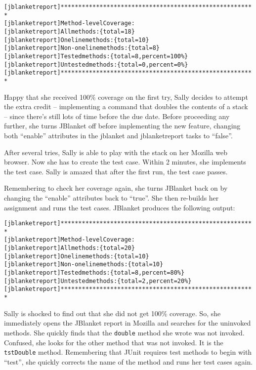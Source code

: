 \begin{alltt}
{\small{}[jblanketreport] *******************************************************
[jblanketreport] Method-level Coverage:
[jblanketreport] All methods: \{total=18\}
[jblanketreport] One line methods: \{total=10\}
[jblanketreport] Non-one line methods: \{total=8\}
[jblanketreport] Tested methods: \{total=8, percent=100\%\}
[jblanketreport] Untested methods: \{total=0,  percent=0\%\}
[jblanketreport] *******************************************************
}
\end{alltt}
Happy that she received 100\% coverage on the first try, Sally decides to
attempt the extra credit -- implementing a command that doubles the
contents of a stack -- since there's still lots of time before the due
date.  Before proceeding any further, she turns JBlanket off before
implementing the new feature, changing both ``enable'' attributes in the
jblanket and jblanketreport tasks to ``false''.

After several tries, Sally is able to play with the stack on her Mozilla
web browser.  Now she has to create the test case.  Within 2 minutes, she
implements the test case.  Sally is amazed that after the first run, the
test case passes.

Remembering to check her coverage again, she turns JBlanket back on by
changing the ``enable'' attributes back to ``true''.  She then re-builds
her assignment and runs the test cases.  JBlanket produces the following
output:

\begin{alltt}
{\small{}[jblanketreport] *******************************************************
[jblanketreport] Method-level Coverage:
[jblanketreport] All methods: \{total=20\}
[jblanketreport] One line methods: \{total=10\}
[jblanketreport] Non-one line methods: \{total=10\}
[jblanketreport] Tested methods: \{total=8, percent=80\%\}
[jblanketreport] Untested methods: \{total=2,  percent=20\%\}
[jblanketreport] *******************************************************
}
\end{alltt}
Sally is shocked to find out that she did not get 100\% coverage.  So, she
immediately opens the JBlanket report in Mozilla and searches for the
uninvoked methods.  She quickly finds that the {\tt double} method she
wrote was not invoked.  Confused, she looks for the other method that was
not invoked.  It is the {\tt tstDouble} method.  Remembering that JUnit
requires test methods to begin with ``test'', she quickly corrects the name
of the method and runs her test cases again.

